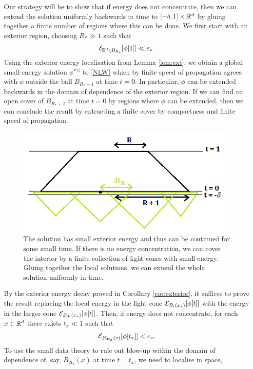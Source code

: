 Our strategy will be to show that if energy does not concentrate, then we can extend the solution uniformly backwards in time to $[-\delta, 1] \times \mathbb R^d$ by gluing together a finite number of regions where this can be done. We first start with an exterior region, choosing $R_* \gg 1$ such that 
	\[
		\mathcal E_{\mathbb R^d \setminus B_{R_*}} [\phi[1]] \ll \varepsilon_*.
	\]
Using the exterior energy localisation from Lemma \ref{lem:ext}, we obtain a global small-energy solution $\phi^{\mathrm{reg}}$ to \eqref{NLW} which by finite speed of propagation agrees with $\phi$ outside the ball $B_{R_* + 1}$ at time $t = 0$. In particular, $\phi$ can be extended backwards in the domain of dependence of the exterior region. If we can find an open cover of $B_{R_* + 2}$ at time $t = 0$ by regions where $\phi$ can be extended, then we can conclude the result by extracting a finite cover by compactness and finite speed of propagation. 

\begin{figure}[h]
	\begin{center}
		\includegraphics{graphics/blowup}
		\caption{The solution has small exterior energy and thus can be continued for some small time. If there is no energy concentration, we can cover the interior by a finite collection of light cones with small energy. Gluing together the local solutions, we can extend the whole solution uniformly in time. }
	\end{center}
\end{figure}	

By the exterior energy decay proved in Corollary \ref{cor:exterior}, it suffices to prove the result replacing the local energy in the light cone $\mathcal E_{B_t (x_*)} [\phi[t]]$ with the energy in the larger cone $\mathcal E_{B_{3t} (x_*)} [\phi[t]]$. Then, if energy does not concentrate, for each $x \in \mathbb R^d$ there exists $t_x \ll 1$ such that
	\[
		 \mathcal E_{B_{3t_x} (x)} [\phi[t_x]] < \varepsilon_*.
	\]	
To use the small data theory to rule out blow-up within the domain of dependence of, say, $B_{2t_x} (x)$ at time $t = t_x$, we need to localise in space, 

